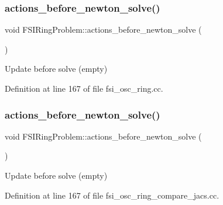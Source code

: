 \subsubsection{\texorpdfstring{actions\+\_\+before\+\_\+newton\+\_\+solve()}{actions\_before\_newton\_solve()}\hspace{0.1cm}{\footnotesize\ttfamily [1/2]}}
{\footnotesize\ttfamily void F\+S\+I\+Ring\+Problem\+::actions\+\_\+before\+\_\+newton\+\_\+solve (\begin{DoxyParamCaption}{ }\end{DoxyParamCaption})\hspace{0.3cm}{\ttfamily [inline]}}



Update before solve (empty) 



Definition at line 167 of file fsi\+\_\+osc\+\_\+ring.\+cc.

\mbox{\label{classFSIRingProblem_a9fd26120e4e078bca685a5c94482ee12}} 
\subsubsection{\texorpdfstring{actions\+\_\+before\+\_\+newton\+\_\+solve()}{actions\_before\_newton\_solve()}\hspace{0.1cm}{\footnotesize\ttfamily [2/2]}}
{\footnotesize\ttfamily void F\+S\+I\+Ring\+Problem\+::actions\+\_\+before\+\_\+newton\+\_\+solve (\begin{DoxyParamCaption}{ }\end{DoxyParamCaption})\hspace{0.3cm}{\ttfamily [inline]}}



Update before solve (empty) 



Definition at line 167 of file fsi\+\_\+osc\+\_\+ring\+\_\+compare\+\_\+jacs.\+cc.

\mbox{\label{classFSIRingProblem_a686782b9af582b68e55c288e1fe4660e}} 
